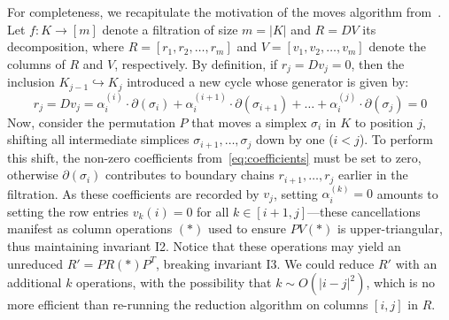 \documentclass[sn-mathphys]{sn-jnl}
\begin{document}
For completeness, we recapitulate the motivation of the moves algorithm from~\cite{busaryev2010tracking}. 
Let $f: K \rightarrow [m]$ denote a filtration of size $m = \lvert K \rvert$ and $R = DV$ its decomposition, where $R = [r_1, r_2, \dots, r_m]$ and $V = [v_1, v_2, \dots, v_m]$ denote the columns of $R$ and $V$, respectively. By definition, if $r_j = D v_j = 0$, then the inclusion $K_{j-1} \hookrightarrow K_{j}$ introduced a new cycle whose generator is given by:
\begin{equation}\label{eq:coefficients}
	r_j = D v_j = \alpha_i^{(i)} \cdot \partial(\sigma_{i}) + \alpha_{i}^{(i+1)} \cdot \partial(\sigma_{i+1}) + \dots + \alpha_{i}^{(j)} \cdot \partial(\sigma_{j}) = 0
\end{equation}
Now, consider the permutation $P$ that moves a simplex $\sigma_i$ in $K$ to position $j$, shifting all intermediate simplices $\sigma_{i+1}, \dots, \sigma_{j}$ down by one ($i < j$). 
To perform this shift, the non-zero coefficients from~\eqref{eq:coefficients} must be set to zero, otherwise $\partial(\sigma_i)$ contributes to boundary chains $r_{i+1}, \dots, r_j$ earlier in the filtration. 
As these coefficients are recorded by $v_j$, setting $\alpha_i^{(k)} = 0$  amounts to setting the row entries $v_k(i) = 0$ for all $k \in [i+1,j]$---these cancellations manifest as column operations $(\ast)$ used to ensure $P V(\ast)$ is upper-triangular, thus maintaining invariant I2.
Notice that these operations may yield an unreduced $R' = P R(\ast) P^T$, breaking invariant I3.
We could reduce $R'$ with an additional $k$ operations, with the possibility that $k \sim O(\lvert i - j\rvert^2)$, which is no more efficient than re-running the reduction algorithm on columns $[i,j]$ in $R$. 
\end{document}
